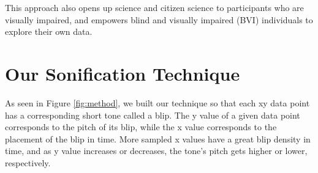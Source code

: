 \documentclass[]{acmsiggraph}
\begin{document}

This approach also opens up science and citizen science to participants who are visually impaired, and empowers blind and visually impaired (BVI) individuals to explore their own data.

\section{Our Sonification Technique}

As seen in Figure \ref{fig:method}, we built our technique so that each xy data point has a corresponding short tone called a blip. The y value of a given data point corresponds to the pitch of its blip, while the x value corresponds to the placement of the blip in time. More sampled x values have a great blip density in time, and as y value increases or decreases, the tone’s pitch gets higher or lower, respectively.
\end{document}
